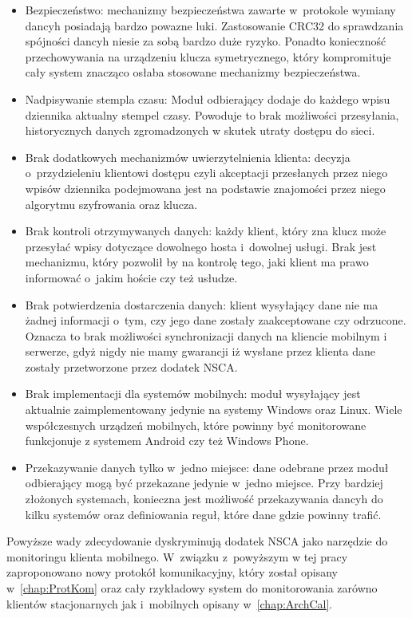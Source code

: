 \begin{itemize}
\item Bezpieczeństwo: mechanizmy bezpieczeństwa zawarte w~protokole
  wymiany dancyh posiadają bardzo powazne luki. Zastosowanie CRC32 do
  sprawdzania spójności dancyh niesie za sobą bardzo duże
  ryzyko. Ponadto konieczność przechowywania na urządzeniu klucza
  symetrycznego, który kompromituje cały system znacząco osłaba
  stosowane mechanizmy bezpieczeństwa.
\item Nadpisywanie stempla czasu: Moduł odbierający dodaje do każdego
  wpisu dziennika aktualny stempel czasy. Powoduje to brak możliwości
  przesyłania, historycznych danych zgromadzonych w skutek utraty
  dostępu do sieci.
\item Brak dodatkowych mechanizmów uwierzytelnienia klienta: decyzja
  o~przydzieleniu klientowi dostępu czyli akceptacji przesłanych przez
  niego wpisów dziennika podejmowana jest na podstawie znajomości
  przez niego algorytmu szyfrowania oraz klucza.
\item Brak kontroli otrzymywanych danych: każdy klient, który zna
  klucz może przesyłać wpisy dotyczące dowolnego hosta i~dowolnej
  usługi. Brak jest mechanizmu, który pozwolił by na kontrolę tego,
  jaki klient ma prawo informować o~jakim hoście czy też usłudze.
\item Brak potwierdzenia dostarczenia danych: klient wysyłający dane
  nie ma żadnej informacji o~tym, czy jego dane zostały zaakceptowane
  czy odrzucone. Oznacza to brak możliwości synchronizacji danych na
  kliencie mobilnym i serwerze, gdyż nigdy nie mamy gwarancji iż
  wysłane przez klienta dane zostały przetworzone przez dodatek NSCA.
\item Brak implementacji dla systemów mobilnych: moduł wysyłający jest
  aktualnie zaimplementowany jedynie na systemy Windows oraz
  Linux. Wiele współczesnych urządzeń mobilnych, które powinny być
  monitorowane funkcjonuje z systemem Android czy też Windows Phone.
\item Przekazywanie danych tylko w~jedno miejsce: dane odebrane przez
  moduł odbierający mogą być przekazane jedynie w~jedno miejsce. Przy
  bardziej złożonych systemach, konieczna jest możliwość przekazywania
  dancyh do kilku systemów oraz definiowania reguł, które dane gdzie
  powinny trafić.
\end{itemize}

Powyższe wady zdecydowanie dyskryminują dodatek NSCA jako narzędzie do
monitoringu klienta mobilnego. W~związku z~powyższym w tej pracy
zaproponowano nowy protokół komunikacyjny, który został opisany
w~\ref{chap:ProtKom} oraz cały rzykładowy system do monitorowania
zarówno klientów stacjonarnych jak i~mobilnych opisany w~\ref{chap:ArchCal}.
